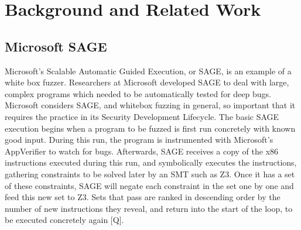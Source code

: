 \documentclass[11pt,expanded,copyright]{fsuthesis}
\begin{document}


\chapter{Background and Related Work}




\section{Microsoft SAGE}

Microsoft's Scalable Automatic Guided Execution, or SAGE, is an example of a white box fuzzer. Researchers at Microsoft developed SAGE to deal with large, complex programs which needed to be automatically tested for deep bugs. Microsoft considers SAGE, and whitebox fuzzing in general, so important that it requires the practice in its Security Development Lifecycle. The basic SAGE execution begins when a program to be fuzzed is first run concretely with known good input. During this run, the program is instrumented with Microsoft's AppVerifier to watch for bugs. Afterwards, SAGE receives a copy of the x86 instructions executed during this run, and symbolically executes the instructions, gathering constraints to be solved later by an SMT such as Z3. Once it has a set of these constraints, SAGE will negate each constraint in the set one by one and feed this new set to Z3. Sets that pass are ranked in descending order by the number of new instructions they reveal, and return into the start of the loop, to be executed concretely again [Q].
\end{document}
